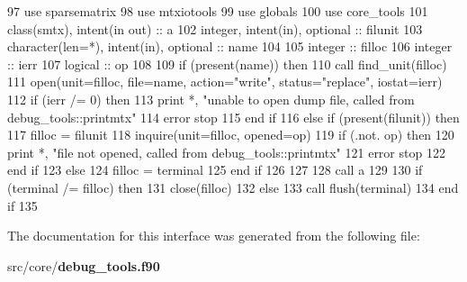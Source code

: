\begin{DoxyCode}
97       \textcolor{keywordtype}{use }sparsematrix
98       \textcolor{keywordtype}{use }mtxiotools
99       \textcolor{keywordtype}{use }globals
100       \textcolor{keywordtype}{use }core_tools
101       \textcolor{keywordtype}{class}(smtx), \textcolor{keywordtype}{intent(in out)} :: a
102       \textcolor{keywordtype}{integer}, \textcolor{keywordtype}{intent(in)}, \textcolor{keywordtype}{optional} :: filunit
103       \textcolor{keywordtype}{character(len=*)}, \textcolor{keywordtype}{intent(in)}, \textcolor{keywordtype}{optional} :: name
104 
105       \textcolor{keywordtype}{integer} :: filloc
106       \textcolor{keywordtype}{integer} :: ierr
107       \textcolor{keywordtype}{logical} :: op
108       
109       \textcolor{keywordflow}{if} (\textcolor{keyword}{present}(name)) \textcolor{keywordflow}{then}
110         \textcolor{keyword}{call }find_unit(filloc)
111         \textcolor{keyword}{open}(unit=filloc, file=name, action=\textcolor{stringliteral}{"write"}, status=\textcolor{stringliteral}{"replace"}, iostat\textcolor{comment}{=ierr)}
112 \textcolor{comment}{        }\textcolor{keywordflow}{if} (ierr /= 0) \textcolor{keywordflow}{then}
113           print *, \textcolor{stringliteral}{"unable to open dump file, called from debug\_tools::printmtx"}
114           error stop
115 \textcolor{keywordflow}{        end if}
116       \textcolor{keywordflow}{else} \textcolor{keywordflow}{if} (\textcolor{keyword}{present}(filunit)) \textcolor{keywordflow}{then}
117         filloc = filunit
118         \textcolor{keyword}{inquire}(unit=filloc, opened=op)
119         \textcolor{keywordflow}{if} (.not. op) \textcolor{keywordflow}{then}
120           print *, \textcolor{stringliteral}{"file not opened, called from debug\_tools::printmtx"}
121           error stop
122 \textcolor{keywordflow}{        end if}
123       \textcolor{keywordflow}{else}
124         filloc = terminal
125 \textcolor{keywordflow}{      end if}
126       
127 
128       \textcolor{keyword}{call }a%
129 
130       \textcolor{keywordflow}{if} (terminal /= filloc) \textcolor{keywordflow}{then}
131         \textcolor{keyword}{close}(filloc)
132       \textcolor{keywordflow}{else}
133         \textcolor{keyword}{call }flush(terminal)
134 \textcolor{keywordflow}{      end if}
135 
\end{DoxyCode}


The documentation for this interface was generated from the following file\+:\begin{DoxyCompactItemize}
\item 
src/core/{\bf debug\+\_\+tools.\+f90}\end{DoxyCompactItemize}
